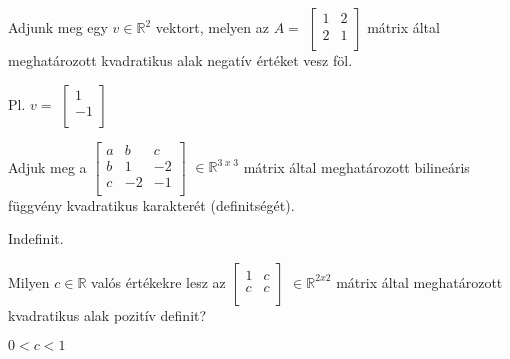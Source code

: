 \begin{frame}
  \begin{tcolorbox}[title={12/2. {\symrook}}]
     Adjunk meg egy $v \in \mathbb{R}^2$ vektort, melyen az $A =$ $\begin{bmatrix} 
  				1 & 2 \\
  				2 & 1 \\
			\end{bmatrix}$  mátrix által meghatározott kvadratikus alak negatív értéket vesz föl.


  \tcblower

    \mmedskip 
    
    Pl. $v =$ $\begin{bmatrix} 
  				1 \\
  				-1 \\
			\end{bmatrix}$
  \end{tcolorbox}
\end{frame}


\begin{frame}
  \begin{tcolorbox}[title={12/3. {\symrook}}]
     Adjuk meg a $\begin{bmatrix} 
  				a & b & c \\
  				b & 1 & -2 \\
  				c & -2 & -1 \\
			\end{bmatrix}$ $\in \mathbb{R}^{3 \; x \; 3}$ mátrix által meghatározott bilineáris függvény kvadratikus karakterét (definitségét).


  \tcblower

    \mmedskip 
    
    Indefinit.
  \end{tcolorbox}
\end{frame}


\begin{frame}
  \begin{tcolorbox}[title={12/4. {\symknight}}]
     Milyen $c \in \mathbb{R}$ valós értékekre lesz az $\begin{bmatrix} 
  				1 & c \\
  				c & c \\
			\end{bmatrix}$ $\in \mathbb{R}^{2 x 2}$ mátrix által meghatározott kvadratikus alak pozitív definit?

  \tcblower

    \mmedskip 
    
    $0 < c < 1$
  \end{tcolorbox}
\end{frame}


